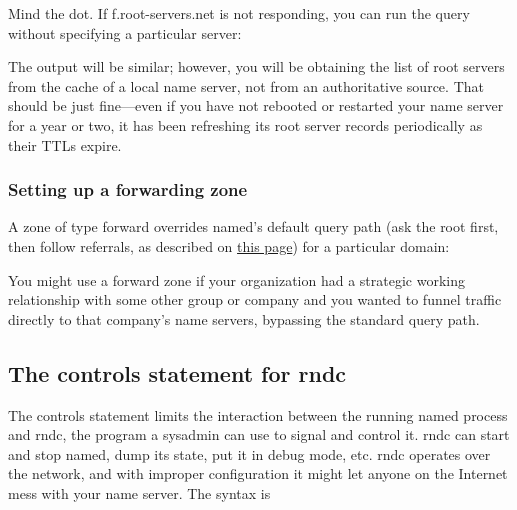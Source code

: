 Mind the dot. If f.root-servers.net is not responding, you can run the
query without specifying a particular server:


The output will be similar; however, you will be obtaining the list of
root servers from the cache of a local name server, not from an
authoritative source. That should be just fine---even if you have not
rebooted or restarted your name server for a year or two, it has been
refreshing its root server records periodically as their TTLs expire.

\subsubsection[Setting up a forwarding
zone]{\texorpdfstring{\protect\hypertarget{part0024_split_044.htmlux5cux23_idTextAnchor917}{}{}Setting
up a forwarding zone}{Setting up a forwarding zone}}

\protect\hypertarget{part0024_split_044.htmlux5cux23_idIndexMarker2196}{}{}\protect\hypertarget{part0024_split_044.htmlux5cux23_idIndexMarker2197}{}{}A
zone of type {forward} overrides {named}'s default query path (ask the
root first, then follow referrals, as described on
\protect\hyperlink{part0024_split_015.htmlux5cux23_idTextAnchor859}{this
page}) for a particular domain:


You might use a {forward} zone if your organization had a strategic
working relationship with some other group or company and you wanted to
funnel traffic directly to that company's name servers, bypassing the
standard query path.

\protect\hypertarget{part0024_split_045.html}{}{}

\hypertarget{part0024_split_045.htmlux5cux23_idContainer1069}{}
\hypertarget{part0024_split_045.htmlux5cux23calibre_pb_44}{%
\subsection[The {controls} statement for
{rndc}]{\texorpdfstring{\protect\hypertarget{part0024_split_045.htmlux5cux23_idTextAnchor918}{}{}The
{controls} statement for
{rndc}}{The controls statement for rndc}}\label{part0024_split_045.htmlux5cux23calibre_pb_44}}

{\protect\hypertarget{part0024_split_045.htmlux5cux23_idIndexMarker2198}{}{}\protect\hypertarget{part0024_split_045.htmlux5cux23_idIndexMarker2199}{}{}\protect\hypertarget{part0024_split_045.htmlux5cux23_idIndexMarker2200}{}{}}The
{controls} statement limits the interaction between the running {named}
process and {rndc}, the program a sysadmin can use to signal and control
it. {rndc} can start and stop {named}, dump its state, put it in debug
mode, etc. {rndc} operates over the network, and with improper
configuration it might let anyone on the Internet mess with your name
server. The syntax is


